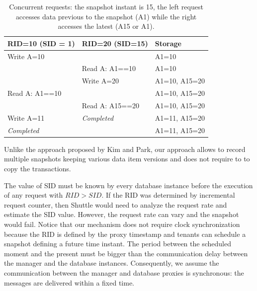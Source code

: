 \begin{table}
\centering
\begin{tabular}{l|l|l}
\textbf{RID=10 (SID = 1)}     & \textbf{RID=20 (SID=15)}   & \textbf{Storage}\\ \hline
Write A=10                    & ~                          & A1=10  \\
~                             & Read A: A1==10             & A1=10  \\         
~                             & Write A=20                 & A1=10, A15=20 \\
Read A: A1==10                & ~                          & A1=10, A15=20 \\
~                             & Read A: A15==20            & A1=10, A15=20 \\
Write A=11                    & \textit{Completed}         & A1=11, A15=20 \\
\textit{Completed}            & ~                          & A1=11, A15=20 \\
\end{tabular}
\caption[Concurrent requests]{Concurrent requests: the snapshot instant is 15, the left request accesses data previous to the snapshot (A1) while the right accesses the latest (A15 or A1). }
\label{tab:snapshot_caso_bicudo}
\end{table}


Unlike the approach proposed by Kim and Park, our approach allows to record multiple snapshots keeping various data item versions and does not require to to copy the transactions.

The value of \acf{SID} must be known by every database instance before the execution of any request with $RID > SID$. If the \ac{RID} was determined by incremental request counter, then Shuttle would need to analyze the request rate and estimate the \ac{SID} value. However, the request rate can vary and the snapshot would fail. Notice that our mechanism does not require clock synchronization because the \ac{RID} is defined by the proxy timestamp and tenants can schedule a snapshot defining a future time instant. The period between the scheduled moment and the present must be bigger than the communication delay between the manager and the database instances. Consequently, we assume the communication between the manager and database proxies is synchronous: the messages are delivered within a fixed time.


